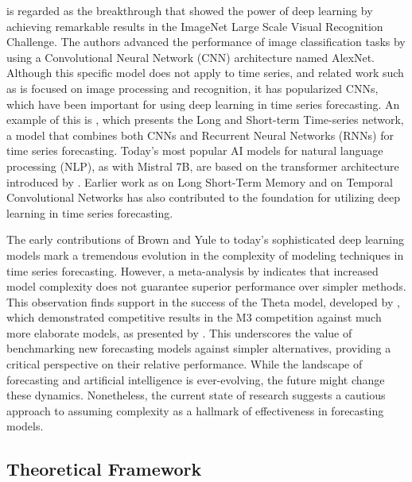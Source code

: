 \documentclass[12pt,a4paper]{article}
\begin{document}
\cite{Krizhevsky2012} is regarded as the breakthrough that showed the power of deep learning by achieving remarkable results in the ImageNet Large Scale Visual Recognition Challenge. The authors advanced the performance of image classification tasks by using a Convolutional Neural Network (CNN) architecture named AlexNet. Although this specific model does not apply to time series, and related work such as \cite{lecun1998gradient} is focused on image processing and recognition, it has popularized CNNs, which have been important for using deep learning in time series forecasting. An example of this is \cite{guokun2018}, which presents the Long and Short-term Time-series network, a model that combines both CNNs and Recurrent Neural Networks (RNNs) for time series forecasting. Today’s most popular AI models for natural language processing (NLP), as \cite{jiang2023mistral} with Mistral 7B, are based on the transformer architecture introduced by \cite{Vaswani2017}. Earlier work as \cite{Hochreiter1997} on Long Short-Term Memory and \cite{bai2018} on Temporal Convolutional Networks has also contributed to the foundation for utilizing deep learning in time series forecasting. 

The early contributions of Brown and Yule to today's sophisticated deep learning models mark a tremendous evolution in the complexity of modeling techniques in time series forecasting. However, a meta-analysis by \cite{Green2015} indicates that increased model complexity does not guarantee superior performance over simpler methods. This observation finds support in the success of the Theta model, developed by \cite{ASSIMAKOPOULOS2000}, which demonstrated competitive results in the M3 competition against much more elaborate models, as presented by \cite{MAKRIDAKIS2000}. This underscores the value of benchmarking new forecasting models against simpler alternatives, providing a critical perspective on their relative performance. While the landscape of forecasting and artificial intelligence is ever-evolving, the future might change these dynamics. Nonetheless, the current state of research suggests a cautious approach to assuming complexity as a hallmark of effectiveness in forecasting models.

\begin{center}
  \section{Theoretical Framework}
\end{center}
\end{document}
